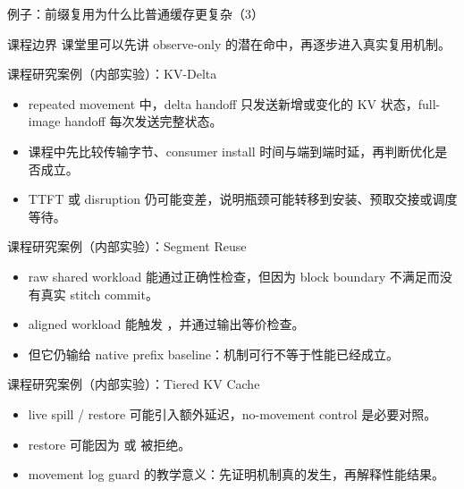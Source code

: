 \begin{frame}{例子：前缀复用为什么比普通缓存更复杂（3）}
\begin{block}{课程边界}
    课堂里可以先讲 observe-only 的潜在命中，再逐步进入真实复用机制。
  \end{block}
\end{frame}

\begin{frame}{课程研究案例（内部实验）：KV-Delta}
  \begin{itemize}
    \item repeated movement 中，delta handoff 只发送新增或变化的 KV 状态，full-image handoff 每次发送完整状态。
    \item 课程中先比较传输字节、consumer install 时间与端到端时延，再判断优化是否成立。
    \item TTFT 或 disruption 仍可能变差，说明瓶颈可能转移到安装、预取交接或调度等待。
  \end{itemize}
  \InternalCaseNote
\end{frame}

\begin{frame}{课程研究案例（内部实验）：Segment Reuse}
  \begin{itemize}
    \item raw shared workload 能通过正确性检查，但因为 block boundary 不满足而没有真实 stitch commit。
    \item aligned workload 能触发 \texttt{}，并通过输出等价检查。
    \item 但它仍输给 native prefix baseline：机制可行不等于性能已经成立。
  \end{itemize}
  \InternalCaseNote
\end{frame}

\begin{frame}{课程研究案例（内部实验）：Tiered KV Cache}
  \begin{itemize}
    \item live spill / restore 可能引入额外延迟，no-movement control 是必要对照。
    \item restore 可能因为 \texttt{} 或 \texttt{} 被拒绝。
    \item movement log guard 的教学意义：先证明机制真的发生，再解释性能结果。
  \end{itemize}
  \InternalCaseNote
\end{frame}

